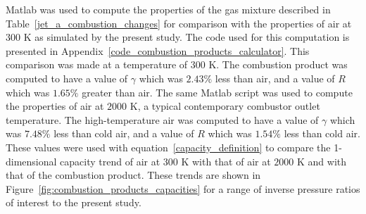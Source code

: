 \documentclass[a4paper, 11pt, oneside]{report}
\begin{document}
Matlab was used to compute the properties of the gas mixture described in Table~\ref{jet_a_combustion_changes} for comparison with the properties of air at $300$ K as simulated by the present study. The code used for this computation is presented in Appendix~\ref{code_combustion_products_calculator}. This comparison was made at a temperature of $300$ K. The combustion product was computed to have a value of $\gamma$ which was $2.43\%$ less than air, and a value of $R$ which was $1.65\%$ greater than air. The same Matlab script was used to compute the properties of air at $2000$ K, a typical contemporary combustor outlet temperature. The high-temperature air was computed to have a value of $\gamma$ which was $7.48\%$ less than cold air, and a value of $R$ which was $1.54\%$ less than cold air. These values were used with equation~\ref{capacity_definition} to compare the 1-dimensional capacity trend of air at $300$ K with that of air at $2000$ K and with that of the combustion product. These trends are shown in Figure~\ref{fig:combustion_products_capacities} for a range of inverse pressure ratios of interest to the present study.
\end{document}
